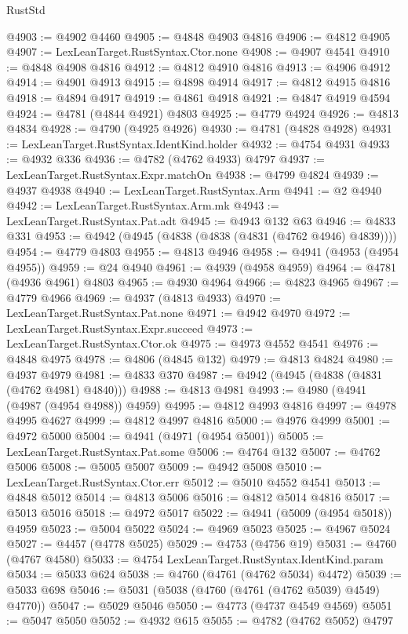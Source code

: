 \begin{lexlean}{RustStd}
\begin{coremodule}
@4903 := @4902 @4460
@4905 := @4848 @4903 @4816
@4906 := @4812 @4905
@4907 := LexLeanTarget.RustSyntax.Ctor.none
@4908 := @4907 @4541
@4910 := @4848 @4908 @4816
@4912 := @4812 @4910 @4816
@4913 := @4906 @4912
@4914 := @4901 @4913
@4915 := @4898 @4914
@4917 := @4812 @4915 @4816
@4918 := @4894 @4917
@4919 := @4861 @4918
@4921 := @4847 @4919 @4594
@4924 := @4781 (@4844 @4921) @4803
@4925 := @4779 @4924
@4926 := @4813 @4834
@4928 := @4790 (@4925 @4926)
@4930 := @4781 (@4828 @4928)
@4931 := LexLeanTarget.RustSyntax.IdentKind.holder
@4932 := @4754 @4931
@4933 := @4932 @336
@4936 := @4782 (@4762 @4933) @4797
@4937 := LexLeanTarget.RustSyntax.Expr.matchOn
@4938 := @4799 @4824
@4939 := @4937 @4938
@4940 := LexLeanTarget.RustSyntax.Arm
@4941 := @2 @4940
@4942 := LexLeanTarget.RustSyntax.Arm.mk
@4943 := LexLeanTarget.RustSyntax.Pat.adt
@4945 := @4943 @132 @63
@4946 := @4833 @331
@4953 := @4942 (@4945 (@4838 (@4838 (@4831 (@4762 @4946) @4839))))
@4954 := @4779 @4803
@4955 := @4813 @4946
@4958 := @4941 (@4953 (@4954 @4955))
@4959 := @24 @4940
@4961 := @4939 (@4958 @4959)
@4964 := @4781 (@4936 @4961) @4803
@4965 := @4930 @4964
@4966 := @4823 @4965
@4967 := @4779 @4966
@4969 := @4937 (@4813 @4933)
@4970 := LexLeanTarget.RustSyntax.Pat.none
@4971 := @4942 @4970
@4972 := LexLeanTarget.RustSyntax.Expr.succeed
@4973 := LexLeanTarget.RustSyntax.Ctor.ok
@4975 := @4973 @4552 @4541
@4976 := @4848 @4975
@4978 := @4806 (@4845 @132)
@4979 := @4813 @4824
@4980 := @4937 @4979
@4981 := @4833 @370
@4987 := @4942 (@4945 (@4838 (@4831 (@4762 @4981) @4840)))
@4988 := @4813 @4981
@4993 := @4980 (@4941 (@4987 (@4954 @4988)) @4959)
@4995 := @4812 @4993 @4816
@4997 := @4978 @4995 @4627
@4999 := @4812 @4997 @4816
@5000 := @4976 @4999
@5001 := @4972 @5000
@5004 := @4941 (@4971 (@4954 @5001))
@5005 := LexLeanTarget.RustSyntax.Pat.some
@5006 := @4764 @132
@5007 := @4762 @5006
@5008 := @5005 @5007
@5009 := @4942 @5008
@5010 := LexLeanTarget.RustSyntax.Ctor.err
@5012 := @5010 @4552 @4541
@5013 := @4848 @5012
@5014 := @4813 @5006
@5016 := @4812 @5014 @4816
@5017 := @5013 @5016
@5018 := @4972 @5017
@5022 := @4941 (@5009 (@4954 @5018)) @4959
@5023 := @5004 @5022
@5024 := @4969 @5023
@5025 := @4967 @5024
@5027 := @4457 (@4778 @5025)
@5029 := @4753 (@4756 @19)
@5031 := @4760 (@4767 @4580)
@5033 := @4754 LexLeanTarget.RustSyntax.IdentKind.param
@5034 := @5033 @624
@5038 := @4760 (@4761 (@4762 @5034) @4472)
@5039 := @5033 @698
@5046 := @5031 (@5038 (@4760 (@4761 (@4762 @5039) @4549) @4770))
@5047 := @5029 @5046
@5050 := @4773 (@4737 @4549 @4569)
@5051 := @5047 @5050
@5052 := @4932 @615
@5055 := @4782 (@4762 @5052) @4797

\end{coremodule}
\end{lexlean}
